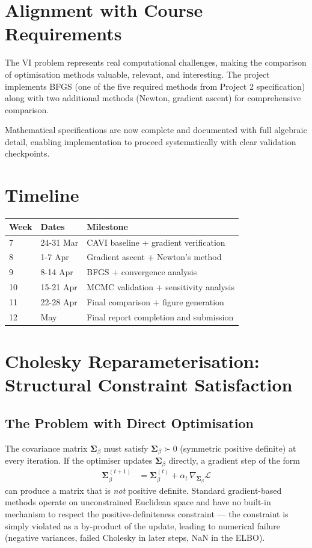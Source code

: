 \documentclass[11pt]{article}
\begin{document}
\section*{Alignment with Course Requirements}

The VI problem represents real computational challenges, making the comparison of optimisation methods valuable, relevant, and interesting. The project implements BFGS (one of the five required methods from Project 2 specification) along with two additional methods (Newton, gradient ascent) for comprehensive comparison.

Mathematical specifications are now complete and documented with full algebraic detail, enabling implementation to proceed systematically with clear validation checkpoints.

\section*{Timeline}

\begin{center}
\begin{tabular}{|l|l|p{7cm}|}
\hline
\textbf{Week} & \textbf{Dates} & \textbf{Milestone} \\
\hline
7 & 24-31 Mar & CAVI baseline + gradient verification \\
8 & 1-7 Apr & Gradient ascent + Newton's method \\
9 & 8-14 Apr & BFGS + convergence analysis \\
10 & 15-21 Apr & MCMC validation + sensitivity analysis \\
11 & 22-28 Apr & Final comparison + figure generation \\
12 & May & Final report completion and submission \\
\hline
\end{tabular}
\end{center}

\section*{Cholesky Reparameterisation: Structural Constraint Satisfaction}

\subsection*{The Problem with Direct Optimisation}

The covariance matrix $\bm{\Sigma}_\beta$ must satisfy $\bm{\Sigma}_\beta \succ 0$ (symmetric positive definite) at every iteration. If the optimiser updates $\bm{\Sigma}_\beta$ directly, a gradient step of the form
\begin{align}
  \bm{\Sigma}_\beta^{(t+1)} &= \bm{\Sigma}_\beta^{(t)} + \alpha_t \,\nabla_{\bm{\Sigma}_\beta}\mathcal{L}
\end{align}
can produce a matrix that is \emph{not} positive definite. Standard gradient-based methods operate on unconstrained Euclidean space and have no built-in mechanism to respect the positive-definiteness constraint --- the constraint is simply violated as a by-product of the update, leading to numerical failure (negative variances, failed Cholesky in later steps, NaN in the ELBO).
\end{document}
